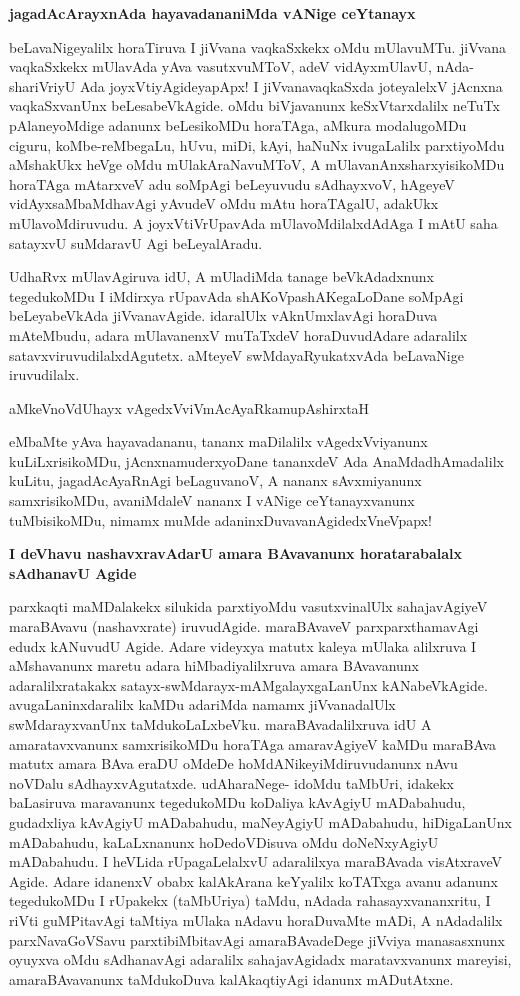 {\bigskip
\noindent
{\large\bf jagadAcArayxnAda hayavadananiMda vANige ceYtanayx}}\label{page128a}
\medskip

\noindent
beLavaNigeyalilx horaTiruva I jiVvana vaqkaSxkekx oMdu mUlavuMTu. jiVvana vaqkaSxkekx mUlavAda yAva vasutxvuMToV, adeV vidAyxmUlavU, nAda-shariVriyU Ada joyxVtiyAgideyapApx! I jiVvanavaqkaSxda joteyalelxV jAcnxna vaqkaSxvanUnx beLesabeVkAgide. oMdu biVjavanunx keSxVtarxdalilx neTuTx pAlaneyoMdige \hbox{adanunx} beLesikoMDu horaTAga, aMkura modalugoMDu ciguru, koMbe-reMbegaLu, hUvu, miDi, kAyi, haNuNx ivugaLalilx parxtiyoMdu aMshakUkx heVge oMdu mUlakAraNavuMToV, A mUlavanAnxsharxyisikoMDu horaTAga mAtarxveV adu soMpAgi beLeyuvudu sAdhayxvoV, hAgeyeV vidAyxsaMbaMdhavAgi yAvudeV oMdu mAtu horaTAgalU, adakUkx mUlavoMdiruvudu. A joyxVtiVrUpavAda mUlavoMdilalxdAdAga I mAtU saha satayxvU suMdaravU Agi beLeyalAradu.

\medskip
UdhaRvx mUlavAgiruva idU, A mUladiMda tanage beVkAdadxnunx tegedukoMDu I iMdirxya rUpavAda shAKoVpashAKegaLoDane soMpAgi beLeyabeVkAda jiVvanavAgide. idaralUlx vAknUmxlavAgi horaDuva mAteMbudu, adara mUlavanenxV muTaTxdeV horaDuvudAdare adaralilx satavxviruvudilalxdAgutetx. aMteyeV swMdayaRyukatxvAda beLavaNige iruvudilalx.

\begin{shloka}
aMkeVnoVdUhayx vAgedxVviVmAcAyaRkamupAshirxtaH
\end{shloka}

eMbaMte yAva hayavadananu, tananx maDilalilx vAgedxVviyanunx kuLiLxrisikoMDu, jAcnxnamuderxyoDane tananxdeV Ada AnaMdadhAmadalilx kuLitu, jagadAcAyaRnAgi beLaguvanoV, A nananx sAvxmiyanunx samxrisikoMDu, avaniMdaleV nananx I vANige ceYtanayxvanunx tuMbisikoMDu, nimamx muMde adaninxDuvavanAgidedxVneVpapx!

\newpage
{\bigskip
\noindent
{\large\bf I deVhavu nashavxravAdarU amara BAvavanunx horatarabalalx sAdhanavU Agide}}\label{page129}
\medskip

\noindent
parxkaqti maMDalakekx silukida parxtiyoMdu vasutxvinalUlx sahajavAgiyeV maraBAvavu (nashavxrate) iruvudAgide. maraBAvaveV parxparxthamavAgi edudx kANuvudU Agide. Adare videyxya matutx kaleya mUlaka alilxruva I aMshavanunx maretu adara hiMbadiyalilxruva amara BAvavanunx adaralilxratakakx satayx-swMdarayx-mAMgalayxgaLanUnx kANabeVkAgide. avugaLaninxdaralilx kaMDu adariMda namamx jiVvanadalUlx swMdarayxvanUnx taMdukoLaLxbeVku. maraBAvadalilxruva idU A amaratavxvanunx samxrisikoMDu horaTAga amaravAgiyeV kaMDu maraBAva matutx amara BAva eraDU oMdeDe hoMdANikeyiMdiruvudanunx nAvu noVDalu sAdhayxvAgutatxde. udAharaNege- idoMdu taMbUri, idakekx baLasiruva maravanunx tegedukoMDu koDaliya kAvAgiyU mADabahudu, gudadxliya kAvAgiyU mADabahudu, maNeyAgiyU mADabahudu, hiDigaLanUnx mADabahudu, kaLaLxnanunx hoDedoVDisuva oMdu doNeNxyAgiyU mADabahudu. I heVLida rUpagaLelalxvU adaralilxya maraBAvada visAtxraveV Agide. Adare idanenxV obabx kalAkArana keYyalilx koTATxga avanu adanunx tegedukoMDu I rUpakekx (taMbUriya) taMdu, nAdada rahasayxvananxritu, I riVti guMPitavAgi taMtiya mUlaka nAdavu horaDuvaMte mADi, A nAdadalilx parxNavaGoVSavu parxtibiMbitavAgi amaraBAvadeDege jiVviya manasasxnunx oyuyxva oMdu sAdhanavAgi adaralilx sahajavAgidadx maratavxvanunx mareyisi, amaraBAvavanunx taMdukoDuva kalAkaqtiyAgi idanunx mADutAtxne. 

